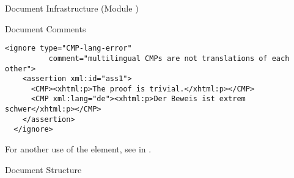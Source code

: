 \begin{tchapter}[id=omdoc-infrastructure,short=Document Infrastructure]{Document Infrastructure (Module )}
{\begin{tsection}[id=comments]{Document Comments}
\begin{lstlisting}[label=lst:ignore-error,
  caption={Marking up Mathematical Errors Using \element{ignore}},
  numbers=none,index={ignore}]
  <ignore type="CMP-lang-error" 
          comment="multilingual CMPs are not translations of each other">
    <assertion xml:id="ass1">
      <CMP><xhtml:p>The proof is trivial.</xhtml:p></CMP>
      <CMP xml:lang="de"><xhtml:p>Der Beweis ist extrem schwer</xhtml:p></CMP>
    </assertion>
  </ignore>
\end{lstlisting}    
For another use of the  element, see  in
.
\end{tsection}

\begin{tsection}[id=sectioning]{Document Structure}


\end{tsection}}
\end{tchapter}
